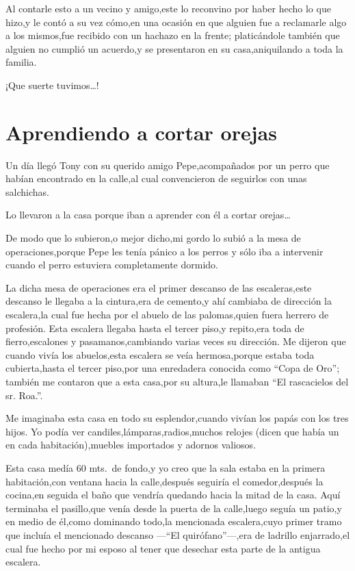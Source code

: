 \documentclass[letterpaper,12pt]{book}
\begin{document}
Al contarle esto a un vecino y amigo,este lo reconvino por haber hecho lo que hizo,y le contó a su vez cómo,en una ocasión en que alguien fue a reclamarle algo a los mismos,fue recibido con un hachazo en la frente; platicándole también que alguien no cumplió un acuerdo,y se presentaron en su casa,aniquilando a toda la familia.

¡Que suerte tuvimos\ldots!

\chapter{Aprendiendo a cortar orejas}
Un día llegó Tony con su querido amigo Pepe,acompañados por un perro que habían encontrado en la calle,al cual convencieron de seguirlos con unas salchichas.

Lo llevaron a la casa porque iban a aprender con él a cortar orejas\ldots

De modo que lo subieron,o mejor dicho,mi gordo lo subió a la mesa de operaciones,porque Pepe les tenía pánico a los perros y sólo iba a intervenir cuando el perro estuviera completamente dormido.

La dicha mesa de operaciones era el primer descanso de las escaleras,este descanso le llegaba a la cintura,era de cemento,y ahí cambiaba de dirección la escalera,la cual fue hecha por el abuelo de las palomas,quien fuera herrero de profesión. Esta escalera llegaba hasta el tercer piso,y repito,era toda de fierro,escalones y pasamanos,cambiando varias veces su dirección. Me dijeron que cuando vivía los abuelos,esta escalera se veía hermosa,porque estaba toda cubierta,hasta el tercer piso,por una enredadera conocida como ``Copa de Oro''; también me contaron que a esta casa,por su altura,le llamaban ``El rascacielos del sr.  Roa.''. 

Me imaginaba  esta casa en todo su esplendor,cuando vivían los papás con los tres hijos. Yo podía ver candiles,lámparas,radios,muchos relojes (dicen que había un en cada habitación),muebles importados y adornos valiosos.

Esta casa medía 60 mts.\ de fondo,y yo creo que la sala estaba en la primera habitación,con ventana hacia la calle,después seguiría el comedor,después la cocina,en seguida el baño que vendría quedando hacia la mitad de la casa. Aquí terminaba el pasillo,que venía desde la puerta de la calle,luego seguía un patio,y en medio de él,como dominando todo,la mencionada escalera,cuyo primer tramo que incluía el mencionado descanso ---``El quirófano''---,era de ladrillo enjarrado,el cual fue hecho por mi esposo al tener que desechar esta parte de la antigua escalera.
\end{document}
